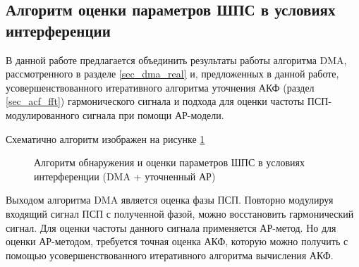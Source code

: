 %

\subsection{Алгоритм оценки параметров ШПС в условиях интерференции}
\label{l:ssec3_dma_lpc_algo}

В данной работе предлагается объединить результаты работы алгоритма DMA, рассмотренного в разделе
\ref{sec_dma_real} и, предложенных в данной работе, усовершенствованного итеративного 
алгоритма уточнения АКФ (раздел \ref{sec_acf_fft}) гармонического сигнала и 
подхода для оценки частоты ПСП-модулированного сигнала при помощи АР-модели.

Схематично алгоритм изображен на рисунке \ref{pic4:dma_quadruple_lpc}

\begin{figure}[H]
\center{}
	\caption{Алгоритм обнаружения и оценки параметров ШПС в условиях интерференции (DMA + уточненный АР)}
	\label{pic4:dma_quadruple_lpc}
\end{figure}

Выходом алгоритма DMA является оценка фазы ПСП. Повторно модулируя входящий сигнал ПСП с полученной
фазой, можно восстановить гармонический сигнал. Для оценки частоты данного сигнала применяется
АР-метод. Но для оценки АР-методом, требуется точная оценка АКФ, которую можно получить
с помощью усовершенствованного итеративного алгоритма вычисления АКФ.

